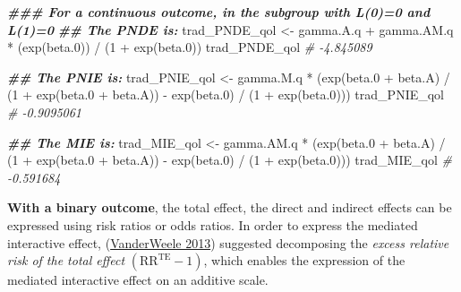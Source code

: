 \documentclass[
]{book}
\newenvironment{Shaded}{\begin{snugshade}}{\end{snugshade}}
\newcommand{\CommentTok}[1]{\textcolor[rgb]{0.56,0.35,0.01}{\textit{#1}}}
\newcommand{\DecValTok}[1]{\textcolor[rgb]{0.00,0.00,0.81}{#1}}
\newcommand{\DocumentationTok}[1]{\textcolor[rgb]{0.56,0.35,0.01}{\textbf{\textit{#1}}}}
\newcommand{\FloatTok}[1]{\textcolor[rgb]{0.00,0.00,0.81}{#1}}
\newcommand{\FunctionTok}[1]{\textcolor[rgb]{0.00,0.00,0.00}{#1}}
\newcommand{\NormalTok}[1]{#1}
\newcommand{\OtherTok}[1]{\textcolor[rgb]{0.56,0.35,0.01}{#1}}
\newcommand{\SpecialCharTok}[1]{\textcolor[rgb]{0.00,0.00,0.00}{#1}}
\begin{document}
\begin{Shaded}
\begin{Highlighting}[]
\DocumentationTok{\#\#\# For a continuous outcome, in the subgroup with L(0)=0 and L(1)=0}
\DocumentationTok{\#\# The PNDE is:}
\NormalTok{trad\_PNDE\_qol }\OtherTok{\textless{}{-}}\NormalTok{ gamma.A.q }\SpecialCharTok{+}\NormalTok{ gamma.AM.q }\SpecialCharTok{*}\NormalTok{ (}\FunctionTok{exp}\NormalTok{(beta}\FloatTok{.0}\NormalTok{)) }\SpecialCharTok{/}\NormalTok{ (}\DecValTok{1} \SpecialCharTok{+} \FunctionTok{exp}\NormalTok{(beta}\FloatTok{.0}\NormalTok{))}
\NormalTok{trad\_PNDE\_qol}
\CommentTok{\# {-}4.845089}

\DocumentationTok{\#\# The PNIE is:}
\NormalTok{trad\_PNIE\_qol }\OtherTok{\textless{}{-}}\NormalTok{ gamma.M.q }\SpecialCharTok{*}
\NormalTok{  (}\FunctionTok{exp}\NormalTok{(beta}\FloatTok{.0} \SpecialCharTok{+}\NormalTok{ beta.A) }\SpecialCharTok{/}
\NormalTok{     (}\DecValTok{1} \SpecialCharTok{+} \FunctionTok{exp}\NormalTok{(beta}\FloatTok{.0} \SpecialCharTok{+}\NormalTok{ beta.A)) }\SpecialCharTok{{-}} \FunctionTok{exp}\NormalTok{(beta}\FloatTok{.0}\NormalTok{) }\SpecialCharTok{/}\NormalTok{ (}\DecValTok{1} \SpecialCharTok{+} \FunctionTok{exp}\NormalTok{(beta}\FloatTok{.0}\NormalTok{)))}
\NormalTok{trad\_PNIE\_qol}
\CommentTok{\# {-}0.9095061}

\DocumentationTok{\#\# The MIE is:}
\NormalTok{trad\_MIE\_qol }\OtherTok{\textless{}{-}}\NormalTok{ gamma.AM.q }\SpecialCharTok{*}
\NormalTok{  (}\FunctionTok{exp}\NormalTok{(beta}\FloatTok{.0} \SpecialCharTok{+}\NormalTok{ beta.A) }\SpecialCharTok{/}\NormalTok{ (}\DecValTok{1} \SpecialCharTok{+} \FunctionTok{exp}\NormalTok{(beta}\FloatTok{.0} \SpecialCharTok{+}\NormalTok{ beta.A)) }\SpecialCharTok{{-}}
     \FunctionTok{exp}\NormalTok{(beta}\FloatTok{.0}\NormalTok{) }\SpecialCharTok{/}\NormalTok{ (}\DecValTok{1} \SpecialCharTok{+} \FunctionTok{exp}\NormalTok{(beta}\FloatTok{.0}\NormalTok{)))}
\NormalTok{trad\_MIE\_qol}
\CommentTok{\# {-}0.591684}
\end{Highlighting}
\end{Shaded}

\textbf{With a binary outcome}, the total effect, the direct and indirect effects can be expressed using risk ratios or odds ratios. In order to express the mediated interactive effect, (\protect\hyperlink{ref-vanderweele2013}{VanderWeele 2013}) suggested decomposing the \emph{excess relative risk of the total effect} \((\text{RR}^{\text{TE}}-1)\), which enables the expression of the mediated interactive effect on an additive scale.
\end{document}
